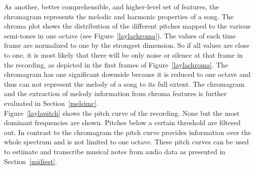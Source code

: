 As another, better comprehensible, and higher-level set of features, the chromagram represents the melodic and harmonic properties of a song. The chroma plot shows the distribution of the different pitches mapped to the various semi-tones in one octave (see Figure~\ref{laylachroma}). The values of each time frame are normalized to one by the strongest dimension. So if all values are close to one, it is most likely that there will be only noise or silence at that frame in the recording, as depicted in the first frames of Figure~\ref{laylachroma}. The chromagram has one significant downside because it is reduced to one octave and thus can not represent the melody of a song to its full extent. The chromagram and the extraction of melody information from chroma features is further evaluated in Section~\ref{melsimc}.\\
Figure~\ref{laylapitch} shows the pitch curve of the recording. None but the most dominant frequencies are shown. Pitches below a certain threshold are filtered out. In contrast to the chromagram the pitch curve provides information over the whole spectrum and is not limited to one octave. These pitch curves can be used to estimate and transcribe musical notes from audio data as presented in Section~\ref{midiest}.\\

